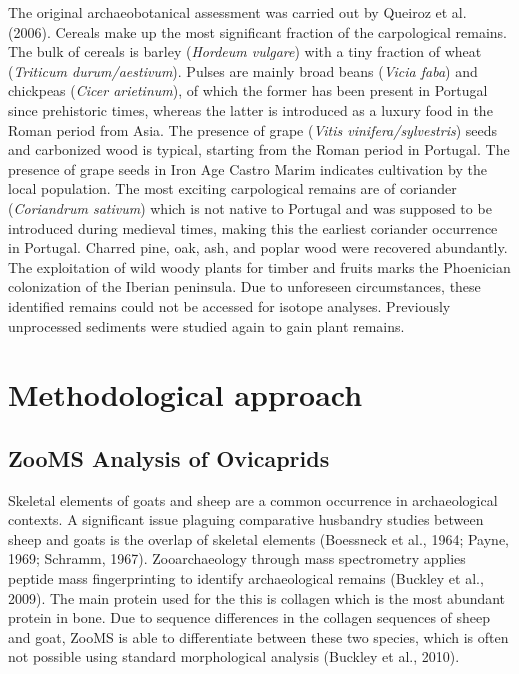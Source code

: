\documentclass[review]{elsarticle} %
\begin{document}
The original archaeobotanical assessment was carried out by Queiroz et al. (2006). Cereals make up the most significant fraction of the carpological remains. The bulk of cereals is barley (\emph{Hordeum vulgare}) with a tiny fraction of wheat (\emph{Triticum durum/aestivum}). Pulses are mainly broad beans (\emph{Vicia faba}) and chickpeas (\emph{Cicer arietinum}), of which the former has been present in Portugal since prehistoric times, whereas the latter is introduced as a luxury food in the Roman period from Asia. The presence of grape (\emph{Vitis vinifera/sylvestris}) seeds and carbonized wood is typical, starting from the Roman period in Portugal. The presence of grape seeds in Iron Age Castro Marim indicates cultivation by the local population. The most exciting carpological remains are of coriander (\emph{Coriandrum sativum}) which is not native to Portugal and was supposed to be introduced during medieval times, making this the earliest coriander occurrence in Portugal. Charred pine, oak, ash, and poplar wood were recovered abundantly. The exploitation of wild woody plants for timber and fruits marks the Phoenician colonization of the Iberian peninsula. Due to unforeseen circumstances, these identified remains could not be accessed for isotope analyses. Previously unprocessed sediments were studied again to gain plant remains.

\hypertarget{methodological-approach}{%
\section{Methodological approach}\label{methodological-approach}}

\hypertarget{zooms-analysis-of-ovicaprids}{%
\subsection{ZooMS Analysis of Ovicaprids}\label{zooms-analysis-of-ovicaprids}}

Skeletal elements of goats and sheep are a common occurrence in archaeological contexts. A significant issue plaguing comparative husbandry studies between sheep and goats is the overlap of skeletal elements (Boessneck et al., 1964; Payne, 1969; Schramm, 1967). Zooarchaeology through mass spectrometry applies peptide mass fingerprinting to identify archaeological remains (Buckley et al., 2009). The main protein used for the this is collagen which is the most abundant protein in bone. Due to sequence differences in the collagen sequences of sheep and goat, ZooMS is able to differentiate between these two species, which is often not possible using standard morphological analysis (Buckley et al., 2010).
\end{document}
